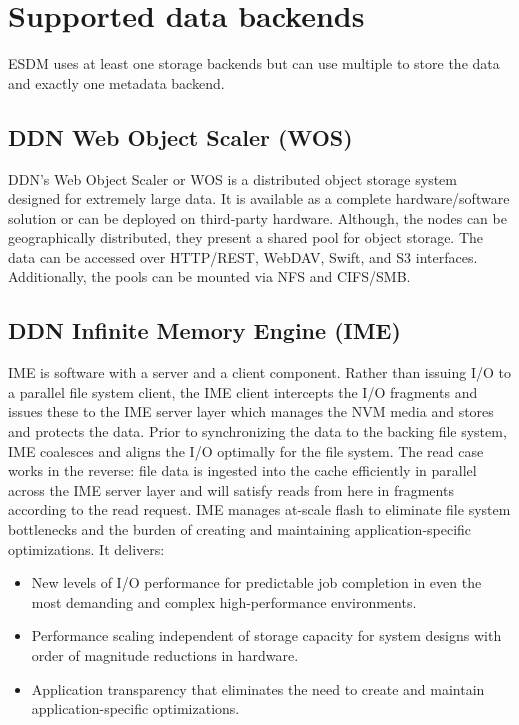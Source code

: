 \section{Supported data backends}
ESDM uses at least one storage backends but can use multiple to store the data and exactly one metadata backend.

\subsection{DDN Web Object Scaler (WOS)}
DDN's Web Object Scaler or WOS is a distributed object storage system designed for extremely large data. 
It is available as a complete hardware/software solution or can be deployed on third-party hardware.
Although, the nodes can be geographically distributed, they present a shared pool for object storage. 
The data can be accessed over HTTP/REST, WebDAV, Swift, and S3 interfaces.
Additionally, the pools can be mounted via NFS and CIFS/SMB. 

\subsection{DDN Infinite Memory Engine (IME)}
IME is software with a server and a client component. 
Rather than issuing I/O to a parallel file system client, the IME client intercepts the I/O fragments and issues these to the IME server layer which manages the NVM media and stores and protects the data.
Prior to synchronizing the data to the backing file system, IME coalesces and aligns the I/O optimally for the file system. 
The read case works in the reverse: file data is ingested into the cache efficiently in parallel across the
IME server layer and will satisfy reads from here in fragments according to the read request. 
IME manages at-scale flash to eliminate file system bottlenecks and the burden of creating and maintaining application-specific optimizations. 
It delivers:

\begin{itemize}
  \item New levels of I/O performance for predictable job completion in even the most demanding and complex high-performance environments.
  \item Performance scaling independent of storage capacity for system designs with order of magnitude reductions in hardware.
  \item Application transparency that eliminates the need to create and maintain application-specific optimizations.
\end{itemize}

